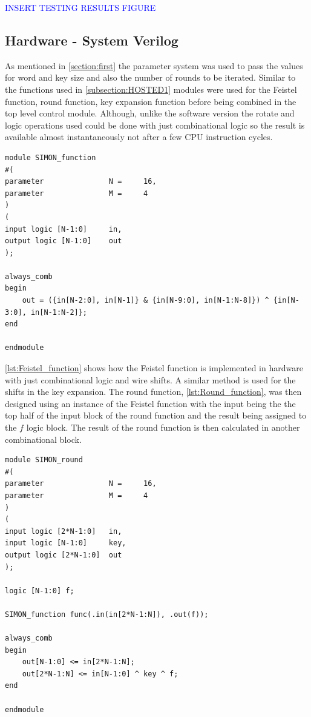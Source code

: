 \documentclass[12pt,twoside,a4paper]{report}
\begin{document}
	\textcolor{blue}{INSERT TESTING RESULTS FIGURE}
    
	\subsection{Hardware - System Verilog}
	\label{subsection:SV1}
	As mentioned in \autoref{section:first} the parameter system was used to pass the values for word and key size and also the number of rounds to be iterated. Similar to the functions used in \autoref{subsection:HOSTED1} modules were used for the Feistel function, round function, key expansion function before being combined in the top level control module. Although, unlike the software version the rotate and logic operations used could be done with just combinational logic so the result is available almost instantaneously not after a few CPU instruction cycles. 

	\begin{minipage}{\linewidth}
	\begin{lstlisting}[label={lst:Feistel_function},caption={The feistel function},style=SVStyle]	
module SIMON_function
#(
parameter 				N = 	16,
parameter 				M =		4
)
(
input logic [N-1:0]		in,
output logic [N-1:0]	out
);

always_comb
begin
	out = ({in[N-2:0], in[N-1]} & {in[N-9:0], in[N-1:N-8]}) ^ {in[N-3:0], in[N-1:N-2]};
end

endmodule
	\end{lstlisting}
	\end{minipage}
	
	\autoref{lst:Feistel_function} shows how the Feistel function is implemented in hardware with just combinational logic and wire shifts.  A similar method is used for the shifts in the key expansion. The round function, \autoref{lst:Round_function}, was then designed using an instance of the Feistel function with the input being the the top half of the input block of the round function and the result being assigned to the $f$ logic block. The result of the round function is then calculated in another combinational block.

	\begin{minipage}{\linewidth}
	\begin{lstlisting}[label={lst:Round_function},caption={The Round function},style=SVStyle]	
module SIMON_round
#(
parameter 				N = 	16,
parameter 				M = 	4	
)
(
input logic [2*N-1:0] 	in,
input logic [N-1:0] 	key,	
output logic [2*N-1:0]	out
);

logic [N-1:0] f;

SIMON_function func(.in(in[2*N-1:N]), .out(f));

always_comb
begin
	out[N-1:0] <= in[2*N-1:N];
	out[2*N-1:N] <= in[N-1:0] ^ key ^ f;
end

endmodule
	\end{lstlisting}
	\end{minipage}
	
\end{document}
